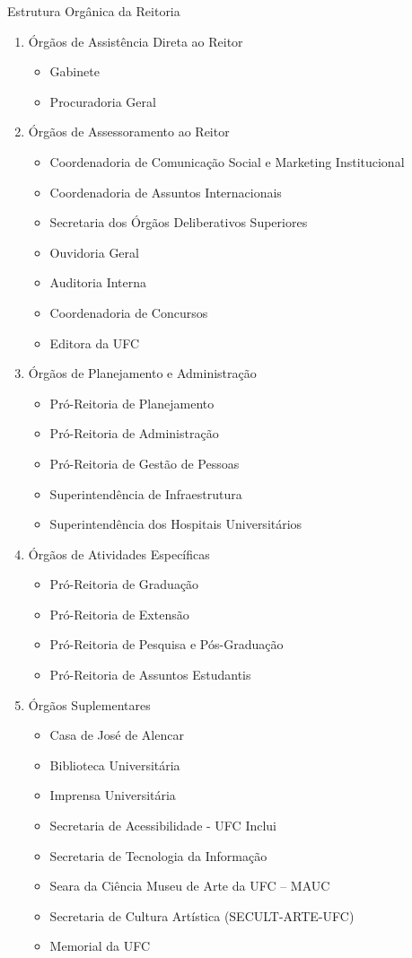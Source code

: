\documentclass{report}
\begin{document}
Estrutura Orgânica da Reitoria 
\begin{enumerate}
\item Órgãos de Assistência Direta ao Reitor
	\begin{itemize}
	\item Gabinete
	\item Procuradoria Geral
	\end{itemize}
\item Órgãos de Assessoramento ao Reitor
	\begin{itemize}
	\item Coordenadoria de Comunicação Social e Marketing Institucional
	\item Coordenadoria de Assuntos Internacionais
	\item Secretaria dos Órgãos Deliberativos Superiores
	\item Ouvidoria Geral
	\item Auditoria Interna
	\item Coordenadoria de Concursos
	\item Editora da UFC
	\end{itemize}
\item Órgãos de Planejamento e Administração
	\begin{itemize}
	\item Pró-Reitoria de Planejamento
	\item Pró-Reitoria de Administração
	\item Pró-Reitoria de Gestão de Pessoas
	\item Superintendência de Infraestrutura
	\item Superintendência dos Hospitais Universitários
	\end{itemize}
\item Órgãos de Atividades Específicas
	\begin{itemize}
	\item Pró-Reitoria de Graduação
	\item Pró-Reitoria de Extensão
	\item Pró-Reitoria de Pesquisa e Pós-Graduação
	\item Pró-Reitoria de Assuntos Estudantis
	\end{itemize}
\item Órgãos Suplementares
	\begin{itemize}
	\item Casa de José de Alencar
	\item Biblioteca Universitária
	\item Imprensa Universitária
	\item Secretaria de Acessibilidade - UFC Inclui
	\item Secretaria de Tecnologia da Informação
	\item Seara da Ciência Museu de Arte da UFC – MAUC
	\item Secretaria de Cultura Artística (SECULT-ARTE-UFC)
	\item Memorial da UFC
	\end{itemize}
\end{enumerate}     
\end{document}
